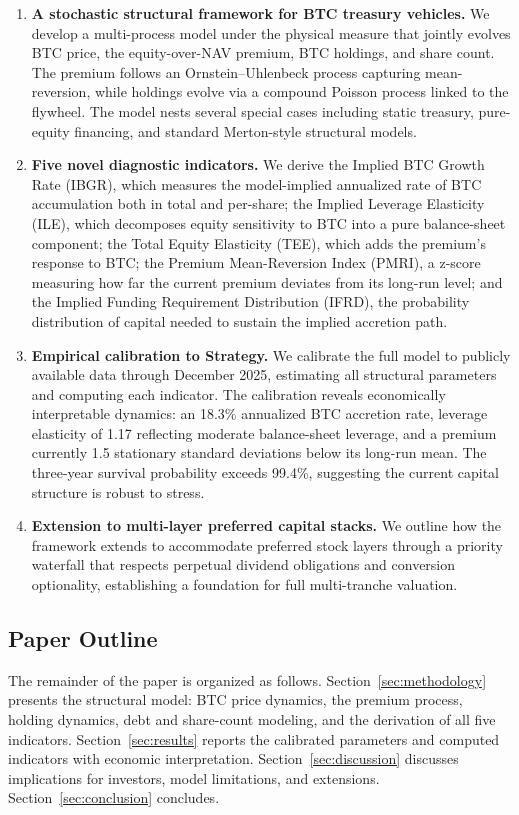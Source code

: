\begin{enumerate}
    \item \textbf{A stochastic structural framework for BTC treasury vehicles.} We develop a multi-process model under the physical measure that jointly evolves BTC price, the equity-over-NAV premium, BTC holdings, and share count. The premium follows an Ornstein--Uhlenbeck process capturing mean-reversion, while holdings evolve via a compound Poisson process linked to the flywheel. The model nests several special cases including static treasury, pure-equity financing, and standard Merton-style structural models.

    \item \textbf{Five novel diagnostic indicators.} We derive the Implied BTC Growth Rate (IBGR), which measures the model-implied annualized rate of BTC accumulation both in total and per-share; the Implied Leverage Elasticity (ILE), which decomposes equity sensitivity to BTC into a pure balance-sheet component; the Total Equity Elasticity (TEE), which adds the premium's response to BTC; the Premium Mean-Reversion Index (PMRI), a z-score measuring how far the current premium deviates from its long-run level; and the Implied Funding Requirement Distribution (IFRD), the probability distribution of capital needed to sustain the implied accretion path.

    \item \textbf{Empirical calibration to Strategy.} We calibrate the full model to publicly available data through December 2025, estimating all structural parameters and computing each indicator. The calibration reveals economically interpretable dynamics: an 18.3\% annualized BTC accretion rate, leverage elasticity of 1.17 reflecting moderate balance-sheet leverage, and a premium currently 1.5 stationary standard deviations below its long-run mean. The three-year survival probability exceeds 99.4\%, suggesting the current capital structure is robust to stress.

    \item \textbf{Extension to multi-layer preferred capital stacks.} We outline how the framework extends to accommodate preferred stock layers through a priority waterfall that respects perpetual dividend obligations and conversion optionality, establishing a foundation for full multi-tranche valuation.
\end{enumerate}

\subsection{Paper Outline}

The remainder of the paper is organized as follows. Section~\ref{sec:methodology} presents the structural model: BTC price dynamics, the premium process, holding dynamics, debt and share-count modeling, and the derivation of all five indicators. Section~\ref{sec:results} reports the calibrated parameters and computed indicators with economic interpretation. Section~\ref{sec:discussion} discusses implications for investors, model limitations, and extensions. Section~\ref{sec:conclusion} concludes.
